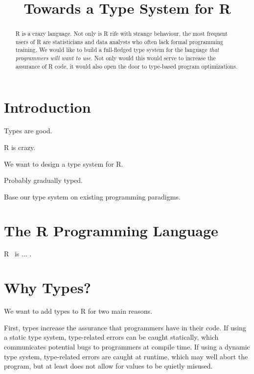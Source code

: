 \documentclass[sigplan,10pt,review,anonymous]{acmart}\settopmatter{printfolios=true,printccs=false,printacmref=false}
\begin{document}
\title{Towards a Type System for R}

\begin{abstract}

R is a crazy language.
Not only is R rife with strange behaviour, the most frequent users of R are statisticians and data analysts who often lack formal programming training.
We would like to build a full-fledged type system for the language {\it that programmers will want to use}.
Not only would this would serve to increase the assurance of R code, it would also open the door to type-based program optimizations.

\end{abstract}

\maketitle


%
%
%
%
\section{Introduction}

Types are good.

R is crazy.

We want to design a type system for R.

Probably gradually typed.

Base our type system on existing programming paradigms.

%
%
%
%
\section{The R Programming Language}

R~\cite{R_man} is ... .

%
%
%
%
\section{Why Types?}

We want to add types to R for two main reasons.

First, types increase the assurance that programmers have in their code.
If using a static type system, type-related errors can be caught statically, which communicates potential bugs to programmers at compile time.
If using a dynamic type system, type-related errors are caught at runtime, which may well abort the program, but at least does not allow for values to be quietly misused.
\end{document}
